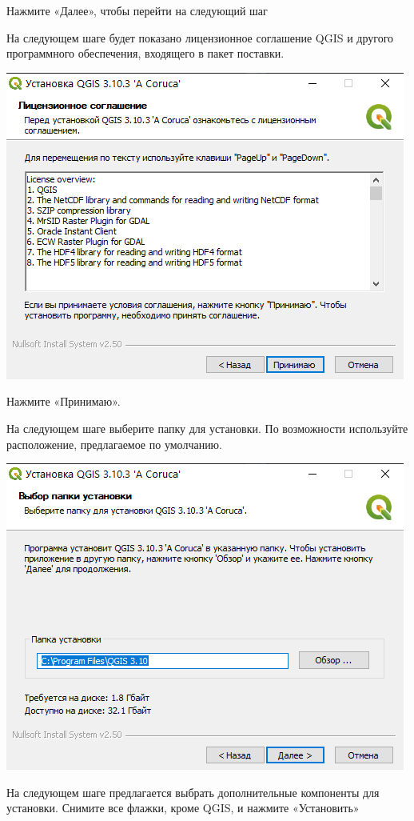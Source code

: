 \documentclass[
  12pt,
]{book}
\begin{document}
Нажмите «Далее», чтобы перейти на следующий шаг

На следующем шаге будет показано лицензионное соглашение QGIS и другого программного обеспечения, входящего в пакет поставки.

\includegraphics{images/installation_instruction_win/win02.png}

Нажмите «Принимаю».

На следующем шаге выберите папку для установки. По возможности используйте расположение, предлагаемое по умолчанию.

\includegraphics{images/installation_instruction_win/win03.png}

На следующем шаге предлагается выбрать дополнительные компоненты для установки. Снимите все флажки, кроме QGIS, и нажмите «Установить»
\end{document}
